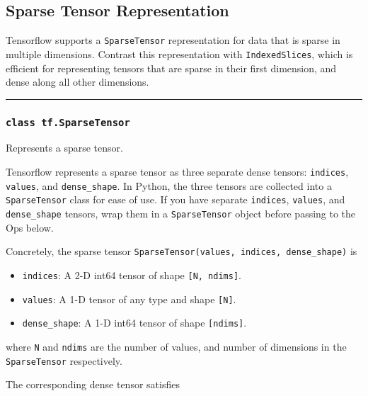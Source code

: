 \subsection{Sparse Tensor Representation
}\label{sparse-tensor-representation}

Tensorflow supports a \texttt{SparseTensor} representation for data that
is sparse in multiple dimensions. Contrast this representation with
\texttt{IndexedSlices}, which is efficient for representing tensors that
are sparse in their first dimension, and dense along all other
dimensions.

\begin{center}\rule{0.5\linewidth}{\linethickness}\end{center}

\subsubsection{\texorpdfstring{\texttt{class\ tf.SparseTensor}
}{class tf.SparseTensor }}\label{class-tf.sparsetensor}

Represents a sparse tensor.

Tensorflow represents a sparse tensor as three separate dense tensors:
\texttt{indices}, \texttt{values}, and \texttt{dense\_shape}. In Python,
the three tensors are collected into a \texttt{SparseTensor} class for
ease of use. If you have separate \texttt{indices}, \texttt{values}, and
\texttt{dense\_shape} tensors, wrap them in a \texttt{SparseTensor}
object before passing to the Ops below.

Concretely, the sparse tensor
\texttt{SparseTensor(values,\ indices,\ dense\_shape)} is

\begin{itemize}
\tightlist
\item
  \texttt{indices}: A 2-D int64 tensor of shape
  \texttt{{[}N,\ ndims{]}}.
\item
  \texttt{values}: A 1-D tensor of any type and shape \texttt{{[}N{]}}.
\item
  \texttt{dense\_shape}: A 1-D int64 tensor of shape
  \texttt{{[}ndims{]}}.
\end{itemize}

where \texttt{N} and \texttt{ndims} are the number of values, and number
of dimensions in the \texttt{SparseTensor} respectively.

The corresponding dense tensor satisfies

\begin{Shaded}
\begin{Highlighting}[]
\OperatorTok{=} 
\NormalTok{dense[}\NormalTok{(indices[i])] }\OperatorTok{=} 
\end{Highlighting}
\end{Shaded}

